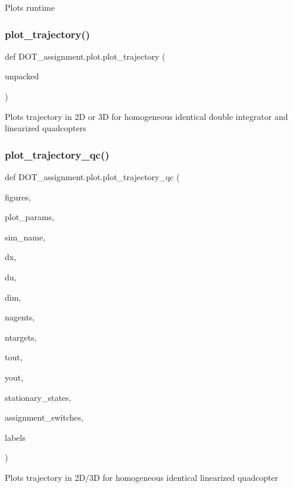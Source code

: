 \begin{DoxyVerb}Plots runtime
\end{DoxyVerb}
 \mbox{\label{namespace_d_o_t__assignment_1_1plot_aa38c6beb5fcecbc098a1aa7038939a9c}} 
\subsubsection{\texorpdfstring{plot\_trajectory()}{plot\_trajectory()}}
{\footnotesize\ttfamily def D\+O\+T\+\_\+assignment.\+plot.\+plot\+\_\+trajectory (\begin{DoxyParamCaption}\item[{}]{unpacked }\end{DoxyParamCaption})}

\begin{DoxyVerb}Plots trajectory in 2D or 3D for homogeneous identical double integrator and linearized quadcopters
\end{DoxyVerb}
 \mbox{\label{namespace_d_o_t__assignment_1_1plot_a241463a4d6d425e3b2045c332ee73877}} 
\subsubsection{\texorpdfstring{plot\_trajectory\_qc()}{plot\_trajectory\_qc()}}
{\footnotesize\ttfamily def D\+O\+T\+\_\+assignment.\+plot.\+plot\+\_\+trajectory\+\_\+qc (\begin{DoxyParamCaption}\item[{}]{figures,  }\item[{}]{plot\+\_\+params,  }\item[{}]{sim\+\_\+name,  }\item[{}]{dx,  }\item[{}]{du,  }\item[{}]{dim,  }\item[{}]{nagents,  }\item[{}]{ntargets,  }\item[{}]{tout,  }\item[{}]{yout,  }\item[{}]{stationary\+\_\+states,  }\item[{}]{assignment\+\_\+switches,  }\item[{}]{labels }\end{DoxyParamCaption})}

\begin{DoxyVerb}Plots trajectory in 2D/3D for homogeneous identical linearized quadcopter
\end{DoxyVerb}
 